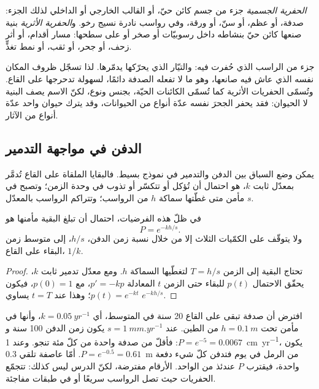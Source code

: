 \begin{definition}\label{def:b2:palaeoenvironments:fossil-kinds}
\emph{الحفرية الجسمية} جزء من جسم كائن حيّ، أو القالب الخارجي أو الداخلي
لذلك الجزء: صدفة، أو عظم، أو سنّ، أو ورقة، وفي رواسب نادرة نسيج رخو.
و\emph{الحفرية الأثرية} بنية صنعها كائن حيّ بنشاطه داخل
رسوبيّات أو صخر أو على سطحها: مسار أقدام، أو أثر زحف، أو جحر، أو ثقب، أو نمط تغذٍّ.
\end{definition}

 جزء من الراسب الذي حُفرت فيه: والتيّار الذي يحرّكها يدمّرها.
لذا تسجّل ظروف المكان نفسه الذي عاش فيه صانعها، وهو ما لا تفعله الصدفة دائمًا،
لسهولة تدحرجها على القاع. وتُسمّى الحفريات الأثرية كما تُسمّى الكائنات الحيّة، بجنس
ونوع، لكنّ الاسم يصف البنية لا الحيوان: فقد يحفر الجحرَ نفسه
عدّة أنواع من الحيوانات، وقد يترك حيوان واحد عدّة أنواع من الآثار.

\subsection*{الدفن في مواجهة التدمير}

يمكن وضع السباق بين الدفن والتدمير في نموذج بسيط. فالبقايا الملقاة على
القاع تُدمَّر بمعدّل ثابت $k$، هو احتمال أن تُؤكل أو تتكسّر أو تذوب في وحدة الزمن؛
وتصبح في مأمن متى غطّتها سماكة $h$ من الرواسب؛ وتتراكم
الرواسب بالمعدّل $s$.

\begin{proposition}\label{prop:b2:palaeoenvironments:burial}
في ظلّ هذه الفرضيات، احتمال أن تبلغ البقية مأمنها هو
\[
  P = e^{-kh/s}.
\]
ولا يتوقّف على الكمّيات الثلاث إلا من خلال نسبة زمن الدفن، $h/s$، إلى
متوسط زمن البقاء على القاع، $1/k$.
\end{proposition}

\begin{proof}
تحتاج البقية إلى الزمن $T = h/s$ لتغطّيها السماكة $h$. ومع معدّل
تدمير ثابت $k$، يحقّق الاحتمال $p(t)$ للبقاء حتى الزمن $t$ المعادلة $p' = -kp$، مع $p(0) =
1$، فيكون $p(t) = e^{-kt}$؛ وهذا عند $t = T$ يساوي $e^{-kh/s}$.
\end{proof}

\begin{example}\label{ex:b2:palaeoenvironments:shell}
افترض أن صدفة تبقى على القاع 20 سنة في المتوسط، أي $k = \qty{0.05}{yr^{-1}}$، وأنها
في مأمن تحت $h = \qty{0.1}{m}$ من الطين. عند $s = \qty{1}{mm.yr^{-1}}$ يكون زمن الدفن 100
سنة و$P = e^{-5} = 0.0067$: فأقلّ من صدفة واحدة من كلّ مئة تنجو. وعند
\qty{1}{cm.yr^{-1}}، يكون $P = e^{-0.5} = 0.61$. أمّا عاصفة تلقي \qty{0.3}{m} من الرمل في يوم
فتدفن كلّ شيء دفعة واحدة، فيقترب $P$ عندئذ من الواحد. الأرقام مفترضة، لكنّ الدرس
ليس كذلك: تتجمّع الحفريات حيث تصل الرواسب سريعًا أو في طبقات مفاجئة.
\end{example}

